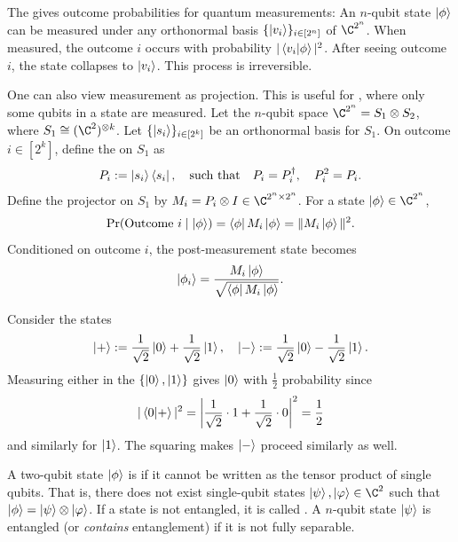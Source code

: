 \begin{definition}[Measurement]
\label{def:measurement}
The  gives outcome probabilities for quantum measurements: An $n$-qubit state $\ket\phi$ can be measured under any orthonormal basis $\{\ket{v_i}\}_{i \in [2^n]}$ of $\C^{2^n}$. When measured, the outcome $i$ occurs with probability $| \braket{v_i}{\phi} |^2$. After seeing outcome $i$, the state collapses to $\ket{v_i}$. This process is irreversible.
\end{definition}

\begin{definition}
One can also view measurement as projection. This is useful for , where only some qubits in a state are measured. Let the $n$-qubit space $\C^{2^n} = S_1 \otimes S_2$, where $S_1 \cong (\C^2)^{\otimes k}$. Let $\{\ket{s_i}\}_{i \in [2^k]}$ be an orthonormal basis for $S_1$. On outcome $i \in [2^k]$, define the  on $S_1$ as
\begin{align}
    P_i := \ket{s_i} \bra{s_i}, \quad 
    \text{such that} \quad
    P_i = P_i^\dagger, \quad
    P_i^2 = P_i.
\end{align}
Define the  projector on $S_1$ by $M_i = P_i \otimes I \in \C^{2^n \times 2^n}$. For a state $\ket\phi \in \C^{2^n}$, 
\begin{align}
    \Pr(\text{Outcome } i \mid \ket\phi)
    = \bra\phi M_i\ket\phi 
    = \| M_i \ket\phi \|^2.
\end{align}
Conditioned on outcome $i$, the post-measurement state becomes
\begin{align}
    \ket{\phi_i}
    = \frac{M_i \ket\phi}{\sqrt{\bra\phi M_i \ket\phi}}.
\end{align}
\end{definition}

\begin{example}
Consider the states
\begin{align}
    \ket{+} := \frac{1}{\sqrt2}\ket0 + \frac{1}{\sqrt2}\ket1, \quad
    \ket{-} := \frac{1}{\sqrt2}\ket0 - \frac{1}{\sqrt2}\ket1.
\end{align}
Measuring either in the  $\{\ket0, \ket1\}$ gives $\ket0$ with $\tfrac{1}{2}$ probability since
\begin{align}
    |\braket{0}{+}|^2 
    = \left| \frac{1}{\sqrt2} \cdot 1 + \frac{1}{\sqrt2} \cdot 0 \right|^2
    = \frac{1}{2}
\end{align}
and similarly for $\ket1$. The squaring makes $\ket{-}$ proceed similarly as well.
\end{example}

\begin{definition}
A two-qubit state $\ket\phi$ is  if it cannot be written as the tensor product of single qubits. That is, there does not exist single-qubit states $\ket\psi, \ket\varphi \in \C^2$ such that $\ket\phi = \ket\psi \otimes \ket\varphi$. If a state is not entangled, it is called . A $n$-qubit state $\ket{\psi}$ is entangled (or \emph{contains} entanglement) if it is not fully separable.
\end{definition}
